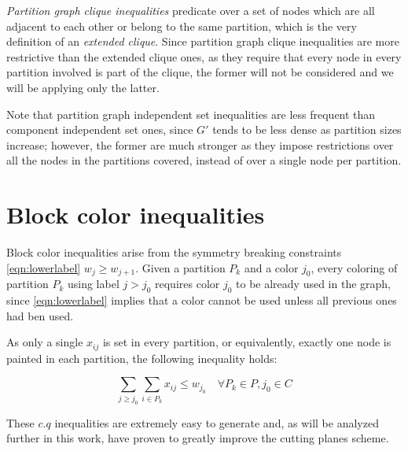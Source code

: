 \textit{Partition graph clique inequalities} predicate over a set of nodes which are all adjacent to each other or belong to the same partition, which is the very definition of an \textit{extended clique}. Since partition graph clique inequalities are more restrictive than the extended clique ones, as they require that every node in every partition involved is part of the clique, the former will not be considered and we will be applying only the latter.

Note that partition graph independent set inequalities are less frequent than component independent set ones, since $G'$ tends to be less dense as partition sizes increase; however, the former are much stronger as they impose restrictions over all the nodes in the partitions covered, instead of over a single node per partition.

\section{Block color inequalities}

Block color inequalities arise from the symmetry breaking constraints \ref{eqn:lowerlabel} $w_j \geq w_{j+1}$. Given a partition $P_k$ and a color $j_0$, every coloring of partition $P_k$ using label $j > j_0$ requires color $j_0$ to be already used in the graph, since \ref{eqn:lowerlabel} implies that a color cannot be used unless all previous ones had ben used. 

As only a single $x_{ij}$ is set in every partition, or equivalently, exactly one node is painted in each partition, the following inequality holds:

\begin{equation}
\label{ineq:blockcp}
\sum_{j \geq j_0} \sum_{i \in P_k} x_{ij} \leq w_{j_0} \quad \forall P_k \in P, j_0 \in C
\end{equation}

These $c.q$ inequalities are extremely easy to generate and, as will be analyzed further in this work, have proven to greatly improve the cutting planes scheme.
